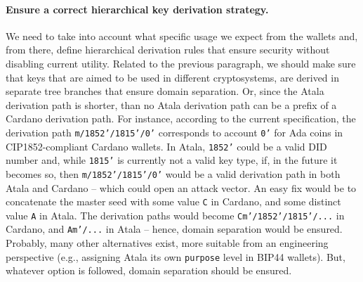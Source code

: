 \paragraph{Ensure a correct hierarchical key derivation strategy.} %
We need to take into account what specific usage we expect from the wallets
and, from there, define hierarchical derivation rules that ensure security
without disabling current utility. Related to the previous paragraph, we should
make sure that keys that are aimed to be used in different
cryptosystems, are derived in separate tree branches that ensure domain
separation. Or, since the Atala derivation path is shorter, than no Atala
derivation path can be a prefix of a Cardano derivation path. For instance,
according to the current specification, the derivation path
\texttt{m/1852'/1815'/0'} corresponds to account \texttt{0'} for Ada coins in
CIP1852-compliant Cardano wallets. In Atala, \texttt{1852'} could be a valid
DID number and, while \texttt{1815'} is currently not a valid key type, if,
in the future it becomes so, then \texttt{m/1852'/1815'/0'} would be a valid
derivation path in both Atala and Cardano -- which could open an attack vector.
An easy fix would be to concatenate the master seed with some value \texttt{C}
in Cardano, and some distinct value \texttt{A} in Atala. The derivation paths would
become \texttt{Cm'/1852'/1815'/...} in Cardano, and \texttt{Am'/...} in Atala
-- hence, domain separation would be ensured. Probably, many other alternatives
exist, more suitable from an engineering perspective (e.g., assigning Atala its
own \texttt{purpose} level in BIP44 wallets). But, whatever option is followed,
domain separation should be ensured.

